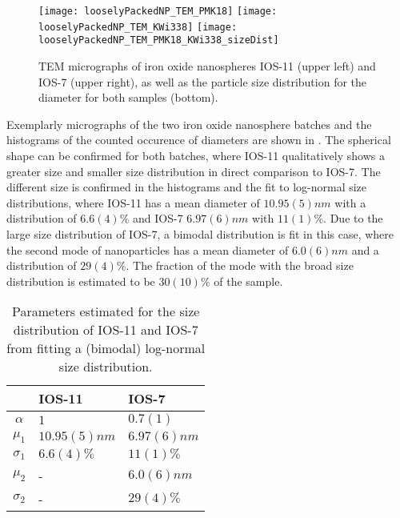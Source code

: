\documentclass[\main/dresen_thesis.tex]{subfiles}
\begin{document}
  \label{sec:looselyPackedNS:nanoparticle:tem}
  \begin{figure}[!htbp]
    \centering
    \texttt{[image: looselyPackedNP\_TEM\_PMK18]}
    \texttt{[image: looselyPackedNP\_TEM\_KWi338]}
    \texttt{[image: looselyPackedNP\_TEM\_PMK18\_KWi338\_sizeDist]}
    \caption{\label{fig:looselyPackedNP:nanoparticle:tem}TEM micrographs of iron oxide nanospheres IOS-11 (upper left) and IOS-7 (upper right), as well as the particle size distribution for the diameter for both samples (bottom).}
  \end{figure}

  Exemplarly micrographs of the two iron oxide nanosphere batches and the histograms of the counted occurence of diameters are shown in .
  The spherical shape can be confirmed for both batches, where IOS-11 qualitatively shows a greater size and smaller size distribution in direct comparison to IOS-7.
  The different size is confirmed in the histograms and the fit to log-normal size distributions, where IOS-11 has a mean diameter of $10.95(5) \unit{nm}$ with a distribution of $6.6(4) \%$ and IOS-7 $6.97(6) \unit{nm}$ with $11(1) \%$.
  Due to the large size distribution of IOS-7, a bimodal distribution is fit in this case, where the second mode of nanoparticles has a mean diameter of $6.0(6) \unit{nm}$ and a distribution of $29(4) \%$.
  The fraction of the mode with the broad size distribution is estimated to be $30(10) \%$ of the sample.

  \begin{table}[!htbp]
    \centering
    \caption{\label{tab:looselyPackedNP:nanoparticle:temModel}Parameters estimated for the size distribution of IOS-11 and IOS-7 from fitting a (bimodal) log-normal size distribution.}
    \begin{tabular}{ c | l | l }
        & IOS-11 & IOS-7 \\
      \hline
      $\alpha$    & $1$                   & $0.7(1)$   \\
      $\mu_1$     & $10.95(5) \unit{nm}$  & $6.97(6) \unit{nm}$ \\
      $\sigma_1$  & $6.6(4) \unit{\%}$    & $11(1) \unit{\%}$ \\
      $\mu_2$     & -                     & $6.0(6) \unit{nm}$ \\
      $\sigma_2$  & -                     & $29(4) \unit{\%}$ \\
      \hline
    \end{tabular}
  \end{table}
\end{document}
